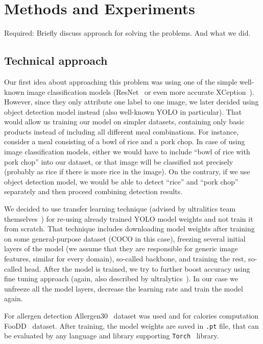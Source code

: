 \documentclass[10pt,twocolumn,letterpaper]{article}
\begin{document}
\section{Methods and Experiments}
Required: Briefly discuss approach for solving the problems. And what we did.

\subsection{Technical approach}

Our first idea about approaching this problem was using one of the simple well-known image classification models (ResNet~\cite{he2015deepresiduallearningimage} or even more accurate XCeption~\cite{chollet2017xceptiondeeplearningdepthwise}).
However, since they only attribute one label to one image, we later decided using object detection model instead (also well-known YOLO in particular).
That would allow us training our model on simpler datasets, containing only basic products instead of including all different meal combinations.
For instance, consider a meal consisting of a bowl of rice and a pork chop.
In case of using image classification models, either we would have to include ``bowl of rice with pork chop'' into our dataset, or that image will be classified not precisely (probably as rice if there is more rice in the image).
On the contrary, if we use object detection model, we would be able to detect ``rice'' and ``pork chop'' separately and then proceed combining detection results.

We decided to use transfer learning technique (advised by ultralitics team themselves~\cite{ultralytics2024transferlearning}) for re-using already trained YOLO model weights and not train it from scratch.
That technique includes downloading model weights after training on some general-purpose dataset (COCO in this case), freezing several initial layers of the model (we assume that they are responsible for generic image features, similar for every domain), so-called backbone, and training the rest, so-called head.
After the model is trained, we try to further boost accuracy using fine tuning approach (again, also described by ultralytics~\cite{ultralytics2024finetuning}).
In our case we unfreeze all the model layers, decrease the learning rate and train the model again.

For allergen detection Allergen30~\cite{mishra2022allergen30} dataset was used and for calories computation FooDD~\cite{yvk7qk3820} dataset.
After training, the model weights are saved in \texttt{.pt} file, that can be evaluated by any language and library supporting \texttt{Torch}~\cite{torchlibrary} library.
\end{document}
